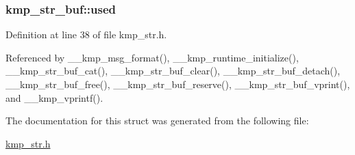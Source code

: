 \hypertarget{structkmp__str__buf_aac402122dd4496ecde0715de265d96b0}{
\subsubsection[{used}]{ kmp\-\_\-str\-\_\-buf\-::used}}\label{structkmp__str__buf_aac402122dd4496ecde0715de265d96b0}


Definition at line 38 of file kmp\-\_\-str.\-h.



Referenced by \-\_\-\-\_\-kmp\-\_\-msg\-\_\-format(), \-\_\-\-\_\-kmp\-\_\-runtime\-\_\-initialize(), \-\_\-\-\_\-kmp\-\_\-str\-\_\-buf\-\_\-cat(), \-\_\-\-\_\-kmp\-\_\-str\-\_\-buf\-\_\-clear(), \-\_\-\-\_\-kmp\-\_\-str\-\_\-buf\-\_\-detach(), \-\_\-\-\_\-kmp\-\_\-str\-\_\-buf\-\_\-free(), \-\_\-\-\_\-kmp\-\_\-str\-\_\-buf\-\_\-reserve(), \-\_\-\-\_\-kmp\-\_\-str\-\_\-buf\-\_\-vprint(), and \-\_\-\-\_\-kmp\-\_\-vprintf().



The documentation for this struct was generated from the following file\-:\begin{DoxyCompactItemize}
\item 
\hyperlink{kmp__str_8h}{kmp\-\_\-str.\-h}\end{DoxyCompactItemize}
